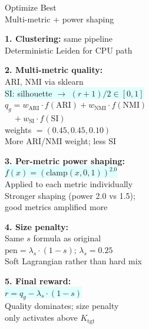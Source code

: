 \documentclass[8pt]{article}
\newlength{\colw}
\begin{document}
\hfill
\begin{minipage}[t]{\colw}
\begin{tcolorbox}[colback=hdrC, colframe=hdrC, fontupper=\bfseries\footnotesize\color{white},
    arc=2pt, left=2pt, right=2pt, top=1pt, bottom=1pt]
\centering Optimize Best\\[-2pt]
{\scriptsize\mdseries Multi-metric + power shaping}
\end{tcolorbox}
\vspace{1pt}

\begin{keyboxB}
\textbf{1. Clustering:} same pipeline\\
{\scriptsize Deterministic Leiden for CPU path}
\end{keyboxB}\vspace{1pt}

\begin{keyboxB}
\textbf{2. Multi-metric quality:}\\
ARI, NMI via sklearn\\
\colorbox{lightcyan}{SI: silhouette $\to$ $(r+1)/2 \in [0,1]$}\\
$q_g = w_\text{ARI} \cdot f(\text{ARI}) + w_\text{NMI} \cdot f(\text{NMI})$\\
$\quad + w_\text{SI} \cdot f(\text{SI})$\\
weights $= (0.45, 0.45, 0.10)$\\
{\scriptsize\color{addedB} More ARI/NMI weight; less SI}
\end{keyboxB}\vspace{1pt}

\begin{keyboxB}
\textbf{3. Per-metric power shaping:}\\
\colorbox{lightcyan}{$f(x) = (\text{clamp}(x, 0, 1))^{2.0}$}\\
Applied to each metric individually\\
{\scriptsize\color{addedB} Stronger shaping (power 2.0 vs 1.5);\\
good metrics amplified more}
\end{keyboxB}\vspace{1pt}

\begin{keyboxB}
\textbf{4. Size penalty:}\\
Same $s$ formula as original\\
$\text{pen} = \lambda_s \cdot (1 - s)$; $\lambda_s = 0.25$\\
{\scriptsize\color{addedB} Soft Lagrangian rather than hard mix}
\end{keyboxB}\vspace{1pt}

\begin{keyboxB}
\textbf{5. Final reward:}\\
\colorbox{lightcyan}{$r = q_g - \lambda_s \cdot (1 - s)$}\\
{\scriptsize Quality dominates; size penalty\\
only activates above $K_\text{tgt}$}
\end{keyboxB}
\end{minipage}
\end{document}
